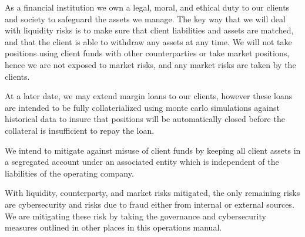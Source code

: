 As a financial institution we own a legal, moral, and ethical duty to
our clients and society to safeguard the assets we manage.  The key
way that we will deal with liquidity risks is to make sure that client
liabilities and assets are matched, and that the client is able to
withdraw any assets at any time.  We will not take positions using
client funds with other counterparties or take market positions, hence
we are not exposed to market risks, and any market risks are taken by
the clients.

At a later date, we may extend margin loans to our clients, however
these loans are intended to be fully collaterialized using monte carlo
simulations against historical data to insure that positions will be
automatically closed before the collateral is insufficient to repay
the loan.

We intend to mitigate against misuse of client funds by keeping all
client assets in a segregated account under an associated entity which
is independent of the liabilities of the operating company.

With liquidity, counterparty, and market risks mitigated, the only
remaining risks are cybersecurity and risks due to fraud either from
internal or external sources.  We are mitigating these risk by taking
the governance and cybersecurity measures outlined in other places in
this operations manual.

